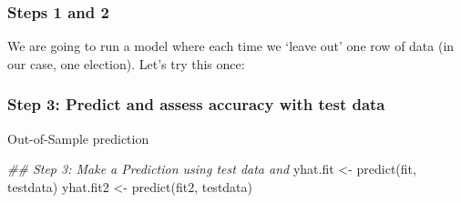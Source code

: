 \documentclass[
  letterpaper,
  DIV=11,
  numbers=noendperiod]{scrreprt}
\newenvironment{Shaded}{\begin{snugshade}}{\end{snugshade}}
\newcommand{\AttributeTok}[1]{\textcolor[rgb]{0.40,0.45,0.13}{#1}}
\newcommand{\DecValTok}[1]{\textcolor[rgb]{0.68,0.00,0.00}{#1}}
\newcommand{\DocumentationTok}[1]{\textcolor[rgb]{0.37,0.37,0.37}{\textit{#1}}}
\newcommand{\FunctionTok}[1]{\textcolor[rgb]{0.28,0.35,0.67}{#1}}
\newcommand{\NormalTok}[1]{\textcolor[rgb]{0.00,0.23,0.31}{#1}}
\newcommand{\OtherTok}[1]{\textcolor[rgb]{0.00,0.23,0.31}{#1}}
\newcommand{\SpecialCharTok}[1]{\textcolor[rgb]{0.37,0.37,0.37}{#1}}
\begin{document}
\hypertarget{steps-1-and-2}{%
\subsubsection{Steps 1 and 2}\label{steps-1-and-2}}

We are going to run a model where each time we `leave out' one row of
data (in our case, one election). Let's try this once:

\begin{Shaded}
\end{Shaded}

\hypertarget{step-3-predict-and-assess-accuracy-with-test-data}{%
\subsubsection{Step 3: Predict and assess accuracy with test
data}\label{step-3-predict-and-assess-accuracy-with-test-data}}

Out-of-Sample prediction

\begin{Shaded}
\begin{Highlighting}[]
\DocumentationTok{\#\# Step 3: Make a Prediction using test data and}
\NormalTok{yhat.fit }\OtherTok{\textless{}{-}} \FunctionTok{predict}\NormalTok{(fit, testdata)}
\NormalTok{yhat.fit2 }\OtherTok{\textless{}{-}} \FunctionTok{predict}\NormalTok{(fit2, testdata)}
\end{Highlighting}
\end{Shaded}
\end{document}
